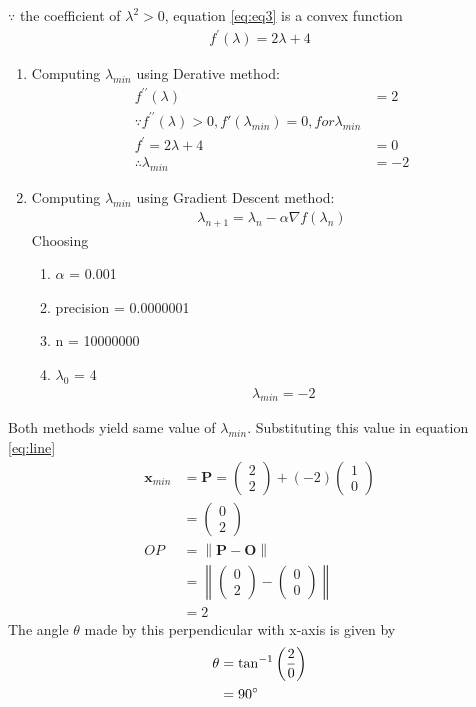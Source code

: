\documentclass[12pt]{article}
\providecommand{\brak}[1]{\ensuremath{\left(#1\right)}}
\providecommand{\norm}[1]{\left\lVert#1\right\rVert}
\newcommand{\myvec}[1]{\ensuremath{\begin{pmatrix}#1\end{pmatrix}}}
\let\vec\mathbf
\begin{document}
$\because$ the coefficient of $\lambda^2>0$, equation \eqref{eq:eq3} is a convex function
\begin{align}
	\label{eq:eq4}
	f^\prime\brak{\lambda} = 2\lambda+4
\end{align}
\begin{enumerate}
\item Computing $\lambda_{min}$ using Derative method:
\begin{align}
	f^{\prime\prime}\brak{\lambda} &= 2\\
	\because f^{\prime\prime}\brak{\lambda}>0,f\prime\brak{\lambda_{min}}=0, for \lambda_{min}\\
	f^{\prime} = 2\lambda+4&=0\\
	\therefore \lambda_{min} &= -2
\end{align}
\item Computing $\lambda_{min}$ using Gradient Descent method:
\begin{align}
	\lambda_{n+1} = \lambda_n - \alpha\nabla f\brak{\lambda_n}
\end{align}
Choosing
\begin{enumerate}
\item $\alpha$ = 0.001
\item precision = 0.0000001
\item n = 10000000
\item $\lambda_0$ = 4
\begin{align}
	\lambda_{min} = -2
\end{align}
\end{enumerate}
\end{enumerate}
Both methods yield same value of $\lambda_{min}$. Substituting this value in equation \eqref{eq:line}
\begin{align}
	\vec{x}_{min} &= \vec{P} = \myvec{2\\2}+\brak{-2}\myvec{1\\0}\\
	&= \myvec{0\\2}\\
	OP &= \norm{\vec{P}-\vec{O}}\\
	&= \norm{\myvec{0\\2}-\myvec{0\\0}}\\
	&= 2
\end{align}
The angle $\theta$ made by this perpendicular with x-axis is given by
\begin{align}
	\theta &= \tan^{-1}{\brak{\frac{2}{0}}}\\
	&= 90\degree
\end{align}
\end{document}
